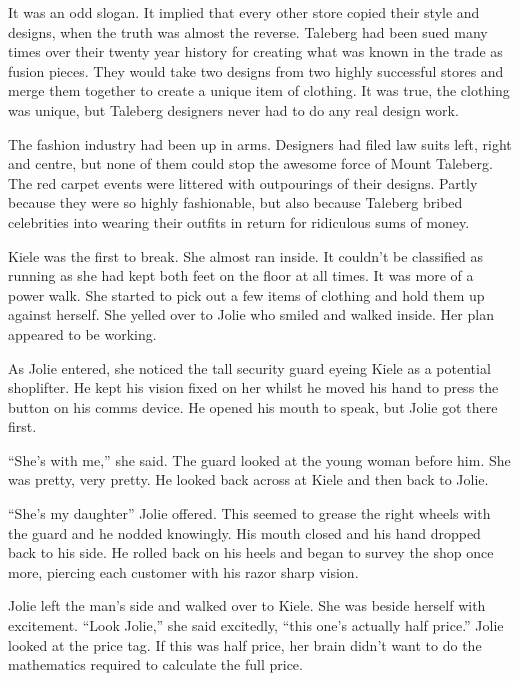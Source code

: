 \thoughtbreak



It was an odd slogan.  It implied that every other store copied their style and designs, when the truth was almost the reverse.  Taleberg had been sued many times over their twenty year history for  creating what was known in the trade as fusion pieces.  They would take two designs from two highly successful stores and merge them together to create a unique item of clothing.  It was true, the clothing was unique, but Taleberg designers never had to do any real design work.  

The fashion industry had been up in arms.  Designers had filed law suits left, right and centre, but none of them could stop the awesome force of Mount Taleberg.  The red carpet events were littered with outpourings of their designs.  Partly because they were so highly fashionable, but also because Taleberg bribed celebrities into wearing their outfits in return for ridiculous sums of money.



\thoughtbreak



Kiele was the first to break.  She almost ran inside.  It couldn't be classified as running as she had kept both feet on the floor at all times.  It was more of a power walk.  She started to pick out a few items of clothing and hold them up against herself.  She yelled over to Jolie who smiled and walked inside.  Her plan appeared to be working.

As Jolie entered, she noticed the tall security guard eyeing Kiele as a potential shoplifter.  He kept his vision fixed on her whilst he moved his hand to press the button on his comms device.  He opened his mouth to speak, but Jolie got there first.

``She's with me,'' she said.  The guard looked at the young woman before him.  She was pretty, very pretty.  He looked back across at Kiele and then back to Jolie.  

``She's my daughter'' Jolie offered.  This seemed to grease the right wheels with the guard and he nodded knowingly.  His mouth closed and his hand dropped back to his side.  He rolled back on his heels and began to survey the shop once more, piercing each customer with his razor sharp vision.

Jolie left the man's side and walked over to Kiele.  She was beside herself with excitement.  ``Look Jolie,'' she said excitedly, ``this one's actually half price.''  Jolie looked at the price tag.  If this was half price, her brain didn't want to do the mathematics required to calculate the full price.  

